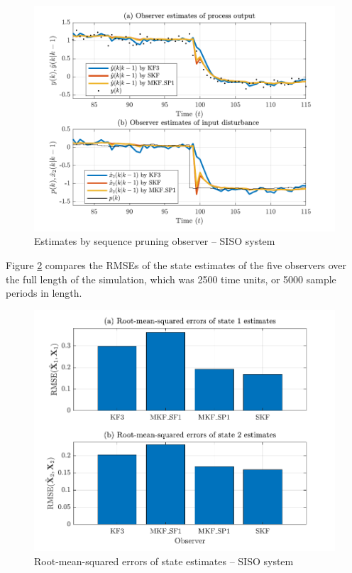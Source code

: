 \begin{figure}[htp]
	\centering
	\includegraphics[width=12cm]{images/rod_obs_sim1_all_seed_y_est2_SP1.pdf}
	\caption{Estimates by sequence pruning observer – SISO system}
	\label{fig:rod-obs-sim1-yest-2-SP}
\end{figure}

Figure \ref{fig:rod-obs-sim1-xest-RMSE-bar} compares the RMSEs of the state estimates of the five observers over the full length of the simulation, which was 2500 time units, or 5000 sample periods in length.
\begin{figure}[htp]
	\centering
	\includegraphics[width=12cm]{images/rod_obs_sim1_all_seed_x_err_bar.pdf}
	\caption{Root-mean-squared errors of state estimates – SISO system}
	\label{fig:rod-obs-sim1-xest-RMSE-bar}
\end{figure}


